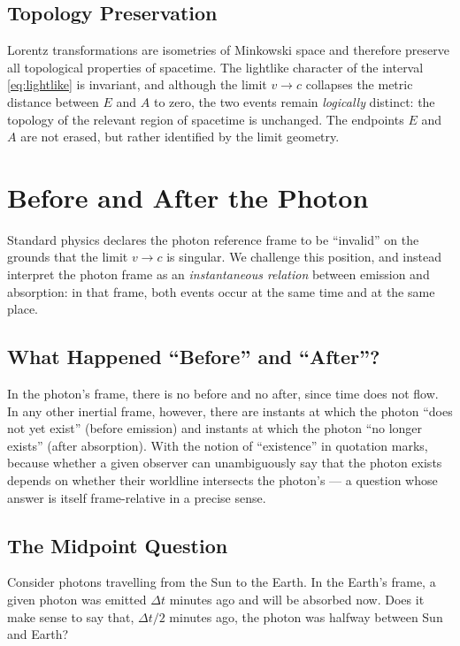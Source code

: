 \documentclass[11pt]{article}
\begin{document}
\subsection{Topology Preservation}

Lorentz transformations are isometries of Minkowski space and therefore preserve all topological properties of spacetime. The lightlike character of the interval \eqref{eq:lightlike} is invariant, and although the limit $v \to c$ collapses the metric distance between $E$ and $A$ to zero, the two events remain \emph{logically} distinct: the topology of the relevant region of spacetime is unchanged. The endpoints $E$ and $A$ are not erased, but rather identified by the limit geometry.

\section{Before and After the Photon}

Standard physics declares the photon reference frame to be ``invalid'' on the grounds that the limit $v \to c$ is singular. We challenge this position, and instead interpret the photon frame as an \emph{instantaneous relation} between emission and absorption: in that frame, both events occur at the same time and at the same place.

\subsection{What Happened ``Before'' and ``After''?}

In the photon's frame, there is no before and no after, since time does not flow. In any other inertial frame, however, there are instants at which the photon ``does not yet exist'' (before emission) and instants at which the photon ``no longer exists'' (after absorption). With the notion of ``existence'' in quotation marks, because whether a given observer can unambiguously say that the photon exists depends on whether their worldline intersects the photon's --- a question whose answer is itself frame-relative in a precise sense.

\subsection{The Midpoint Question}

Consider photons travelling from the Sun to the Earth. In the Earth's frame, a given photon was emitted $\Delta t$ minutes ago and will be absorbed now. Does it make sense to say that, $\Delta t/2$ minutes ago, the photon was halfway between Sun and Earth?
\end{document}

